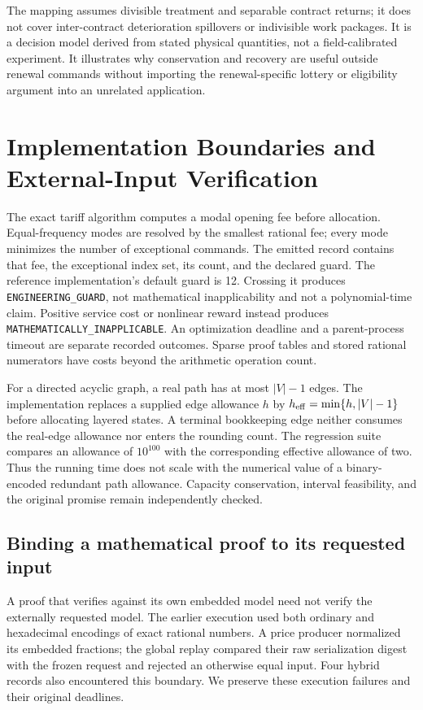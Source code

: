 \documentclass[11pt,letterpaper]{article}
\theoremstyle{definition}\newtheorem{remark}[theorem]{Remark}
\begin{document}
The mapping assumes divisible treatment and separable contract returns; it does not cover inter-contract deterioration spillovers or indivisible work packages. It is a decision model derived from stated physical quantities, not a field-calibrated experiment. It illustrates why conservation and recovery are useful outside renewal commands without importing the renewal-specific lottery or eligibility argument into an unrelated application.
\section{Implementation Boundaries and External-Input Verification}\label{sec:implementation63}
The exact tariff algorithm computes a modal opening fee before allocation. Equal-frequency modes are resolved by the smallest rational fee; every mode minimizes the number of exceptional commands. The emitted record contains that fee, the exceptional index set, its count, and the declared guard. The reference implementation's default guard is 12. Crossing it produces \texttt{ENGINEERING\_GUARD}, not mathematical inapplicability and not a polynomial-time claim. Positive service cost or nonlinear reward instead produces \texttt{MATHEMATICALLY\_INAPPLICABLE}. An optimization deadline and a parent-process timeout are separate recorded outcomes. Sparse proof tables and stored rational numerators have costs beyond the arithmetic operation count.

For a directed acyclic graph, a real path has at most $|V|-1$ edges. The implementation replaces a supplied edge allowance $h$ by $h_{\rm eff}=\min\{h,|V|-1\}$ before allocating layered states. A terminal bookkeeping edge neither consumes the real-edge allowance nor enters the rounding count. The regression suite compares an allowance of $10^{100}$ with the corresponding effective allowance of two. Thus the running time does not scale with the numerical value of a binary-encoded redundant path allowance. Capacity conservation, interval feasibility, and the original promise remain independently checked.

\subsection{Binding a mathematical proof to its requested input}\label{sec:binding63}
A proof that verifies against its own embedded model need not verify the externally requested model. The earlier execution used both ordinary and hexadecimal encodings of exact rational numbers. A price producer normalized its embedded fractions; the global replay compared their raw serialization digest with the frozen request and rejected an otherwise equal input. Four hybrid records also encountered this boundary. We preserve these execution failures and their original deadlines.
\end{document}
